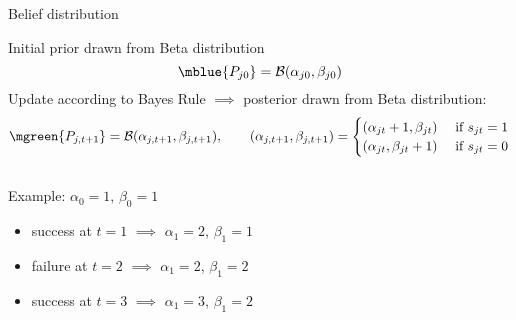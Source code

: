 \begin{frame}[t]{Belief distribution}

Initial prior drawn from Beta distribution 
\begin{equation*}
    \mblue{P_{j0}} = \mathcal{B} (\alpha_{j0}, \beta_{j0})
\end{equation*}
Update according to Bayes Rule $\implies$ posterior drawn from Beta distribution:
\begin{equation*}
    \mgreen{P_{j,t+1}} = \mathcal{B} (\alpha_{j,t+1}, \beta_{j,t+1}), \quad \quad 
    (\alpha_{j,t+1}, \beta_{j,t+1}) = 
    \begin{cases} 
        (\alpha_{jt} + 1, \beta_{jt}) &\text{ if } \pass_{jt} = 1 \\
        (\alpha_{jt}, \beta_{jt} + 1) &\text{ if } \pass_{jt} = 0
    \end{cases}
\end{equation*}

\vspace{3ex}
\begin{columns}[T] %
\begin{column}{.51\textwidth}

\pause
\vspace{3ex}
Example: $\alpha_0 = 1$, $\beta_0 = 1$
\vspace{1.5ex}
\begin{itemize}
    \item <3-> success at $t=1$ $\implies$ $\alpha_1 = 2$, $\beta_1 = 1$

    \vspace{1.5ex}
    \item <4-> failure at $t=2$ $\implies$ $\alpha_1 = 2$, $\beta_1 = 2$
    
    \vspace{1.5ex}
    \item <5-> success at $t=3$ $\implies$ $\alpha_1 = 3$, $\beta_1 = 2$
\end{itemize}

\end{column}%
\begin{column}{.39\textwidth}
\begin{figure}
\end{figure}
\end{column}%
\end{columns}
\hypertarget<2>{model_beta_11}{
  \hyperlink{simulate}{}
  \hyperlink{sim_default}{}
}
\hypertarget<4>{model_beta_22}{\hyperlink{sim_beliefs}{}}


\end{frame}




